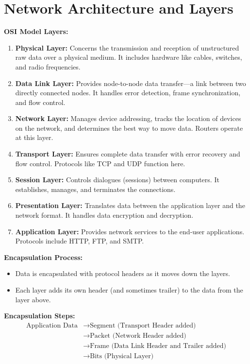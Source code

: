 \documentclass[10pt]{article}
\begin{document}
\section*{Network Architecture and Layers}

\textbf{OSI Model Layers:}
\begin{enumerate}
    \item \textbf{Physical Layer:} Concerns the transmission and reception of unstructured raw data over a physical medium. It includes hardware like cables, switches, and radio frequencies.
    \item \textbf{Data Link Layer:} Provides node-to-node data transfer—a link between two directly connected nodes. It handles error detection, frame synchronization, and flow control.
    \item \textbf{Network Layer:} Manages device addressing, tracks the location of devices on the network, and determines the best way to move data. Routers operate at this layer.
    \item \textbf{Transport Layer:} Ensures complete data transfer with error recovery and flow control. Protocols like TCP and UDP function here.
    \item \textbf{Session Layer:} Controls dialogues (sessions) between computers. It establishes, manages, and terminates the connections.
    \item \textbf{Presentation Layer:} Translates data between the application layer and the network format. It handles data encryption and decryption.
    \item \textbf{Application Layer:} Provides network services to the end-user applications. Protocols include HTTP, FTP, and SMTP.
\end{enumerate}

\textbf{Encapsulation Process:}
\begin{itemize}
    \item Data is encapsulated with protocol headers as it moves down the layers.
    \item Each layer adds its own header (and sometimes trailer) to the data from the layer above.
\end{itemize}

\textbf{Encapsulation Steps:}
\[
\begin{aligned}
\text{Application Data} & \rightarrow \text{Segment (Transport Header added)} \\
& \rightarrow \text{Packet (Network Header added)} \\
& \rightarrow \text{Frame (Data Link Header and Trailer added)} \\
& \rightarrow \text{Bits (Physical Layer)}
\end{aligned}
\]
\end{document}
